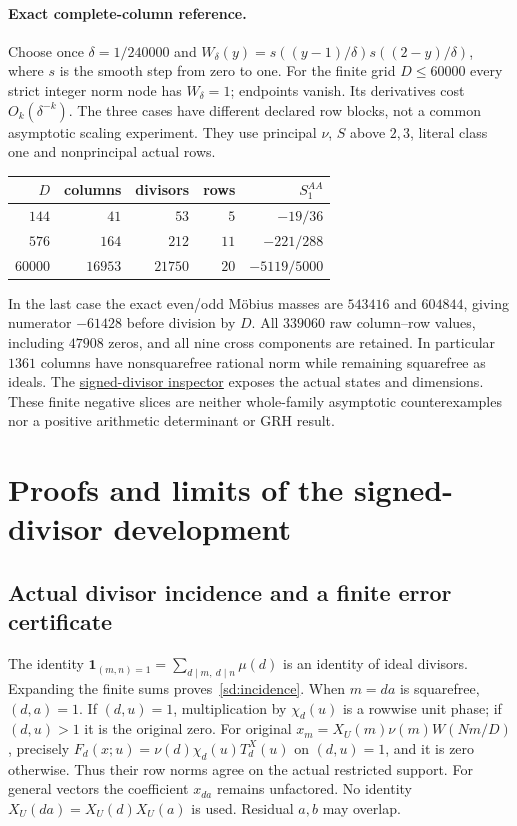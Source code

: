 \documentclass[11pt]{article}
\theoremstyle{definition}\newtheorem{definition}[theorem]{Definition}
\theoremstyle{remark}\newtheorem{remark}[theorem]{Remark}
\begin{document}
\paragraph{Exact complete-column reference.}
Choose once $\delta=1/240000$ and
$W_\delta(y)=s((y-1)/\delta)s((2-y)/\delta)$, where $s$ is the smooth
step from zero to one. For the finite grid $D\le60000$ every strict
integer norm node has $W_\delta=1$; endpoints vanish. Its derivatives
cost $O_k(\delta^{-k})$. The three cases have different declared row
blocks, not a common asymptotic scaling experiment. They use principal
$\nu$, $S$ above $2,3$, literal class one and nonprincipal actual rows.
\begin{center}
\begin{tabular}{r|r|r|r|r}
 $D$ & columns & divisors & rows & $S_1^{AA}$\\\hline
 $144$ & $41$ & $53$ & $5$ & $-19/36$\\
 $576$ & $164$ & $212$ & $11$ & $-221/288$\\
 $60000$ & $16953$ & $21750$ & $20$ & $-5119/5000$
\end{tabular}
\end{center}
In the last case the exact even/odd M\"obius masses are
$543416$ and $604844$, giving numerator $-61428$ before division by $D$.
All $339060$ raw column--row values, including $47908$ zeros, and all nine
cross components are retained. In particular $1361$ columns have
nonsquarefree rational norm while remaining squarefree as ideals.
The \href{https://amelie-iska.github.io/GRH-research/signed-divisor.html}{signed-divisor inspector}
exposes the actual states and dimensions. These finite negative slices
are neither whole-family asymptotic counterexamples nor a positive
arithmetic determinant or GRH result.

\section{Proofs and limits of the signed-divisor development}\label{sd:details}
\subsection{Actual divisor incidence and a finite error certificate}
The identity
$\mathbf1_{(m,n)=1}=\sum_{d\mid m,\ d\mid n}\mu(d)$ is an identity of
ideal divisors. Expanding the finite sums proves~\eqref{sd:incidence}.
When $m=da$ is squarefree, $(d,a)=1$. If $(d,u)=1$, multiplication by
$\chi_d(u)$ is a rowwise unit phase; if $(d,u)>1$ it is the original zero.
For original $x_m=X_U(m)\nu(m)W(Nm/D)$, precisely
$F_d(x;u)=\nu(d)\chi_d(u)T_d^X(u)$ on $(d,u)=1$, and it is zero
otherwise. Thus their row norms agree on the actual restricted support.
For general vectors the coefficient $x_{da}$ remains unfactored.
No identity $X_U(da)=X_U(d)X_U(a)$ is used. Residual $a,b$ may overlap.
\end{document}
